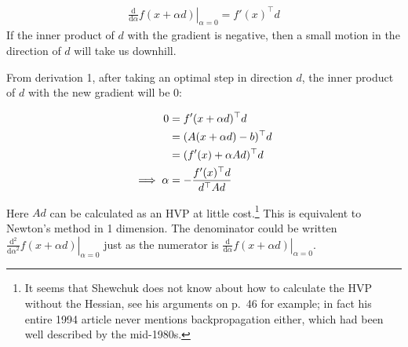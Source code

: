 \documentclass[11pt]{article}
\newcommand{\T}{\top}
\renewcommand{\(}{\left(}
\renewcommand{\)}{\right)}
\newcommand{\ud}{\mathrm{d}}
\newcommand{\dby}[2]{\frac{\ud #1}{\ud #2}}
\newcommand{\dbyt}[2]{\frac{\ud^2 #1}{{\ud #2}^2}}
\begin{document}

\begin{align}
\left.\dby{}{\alpha}f(x+\alpha d) \right|_{\alpha=0} = f'(x)^\T d
\end{align}
If the inner product of $d$ with the gradient is negative, then a
small motion in the direction of $d$ will take us downhill. \label{downhill}

From derivation 1, after taking an optimal step in direction $d$, the inner product of $d$ with the new gradient will be 0:

\begin{align}
  0 &= f'(x+\alpha d)^\T d \\
  &= (A(x+\alpha d)-b)^\T d \\
  &= (f'(x)+\alpha A d)^\T d \\
\implies  \alpha &= -{f'(x)^\T d \over d^\T A d}
\end{align}

Here $Ad$ can be calculated as an HVP at little cost.\footnote{It
seems that Shewchuk does not know about how to calculate the HVP
without the Hessian, see his arguments on p.~46 for example; in fact
his entire 1994 article never mentions backpropagation either, which
had been well described by the mid-1980s.} This is equivalent to
Newton's method in 1 dimension. The denominator could be written
$\left. \dbyt{}{\alpha}f(x+\alpha d) \right|_{\alpha=0}$ just as the
numerator is $\left. \dby{}{\alpha}f(x+\alpha d) \right|_{\alpha=0}$.
\end{document}
